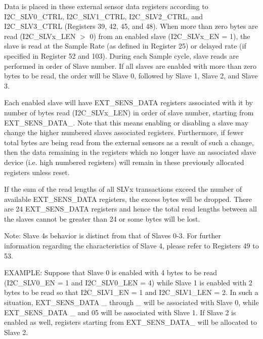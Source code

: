 Data is placed in these external sensor data registers according to I2\+C\+\_\+\+S\+L\+V0\+\_\+\+C\+T\+RL, I2\+C\+\_\+\+S\+L\+V1\+\_\+\+C\+T\+RL, I2\+C\+\_\+\+S\+L\+V2\+\_\+\+C\+T\+RL, and I2\+C\+\_\+\+S\+L\+V3\+\_\+\+C\+T\+RL (Registers 39, 42, 45, and 48). When more than zero bytes are read (I2\+C\+\_\+\+S\+L\+Vx\+\_\+\+L\+EN $>$ 0) from an enabled slave (I2\+C\+\_\+\+S\+L\+Vx\+\_\+\+EN = 1), the slave is read at the Sample Rate (as defined in Register 25) or delayed rate (if specified in Register 52 and 103). During each Sample cycle, slave reads are performed in order of Slave number. If all slaves are enabled with more than zero bytes to be read, the order will be Slave 0, followed by Slave 1, Slave 2, and Slave 3.

Each enabled slave will have E\+X\+T\+\_\+\+S\+E\+N\+S\+\_\+\+D\+A\+TA registers associated with it by number of bytes read (I2\+C\+\_\+\+S\+L\+Vx\+\_\+\+L\+EN) in order of slave number, starting from E\+X\+T\+\_\+\+S\+E\+N\+S\+\_\+\+D\+A\+T\+A\+\_. Note that this means enabling or disabling a slave may change the higher numbered slaves\textquotesingle{} associated registers. Furthermore, if fewer total bytes are being read from the external sensors as a result of such a change, then the data remaining in the registers which no longer have an associated slave device (i.\+e. high numbered registers) will remain in these previously allocated registers unless reset.

If the sum of the read lengths of all S\+L\+Vx transactions exceed the number of available E\+X\+T\+\_\+\+S\+E\+N\+S\+\_\+\+D\+A\+TA registers, the excess bytes will be dropped. There are 24 E\+X\+T\+\_\+\+S\+E\+N\+S\+\_\+\+D\+A\+TA registers and hence the total read lengths between all the slaves cannot be greater than 24 or some bytes will be lost.

Note\+: Slave 4\textquotesingle{}s behavior is distinct from that of Slaves 0-\/3. For further information regarding the characteristics of Slave 4, please refer to Registers 49 to 53.

E\+X\+A\+M\+P\+LE\+: Suppose that Slave 0 is enabled with 4 bytes to be read (I2\+C\+\_\+\+S\+L\+V0\+\_\+\+EN = 1 and I2\+C\+\_\+\+S\+L\+V0\+\_\+\+L\+EN = 4) while Slave 1 is enabled with 2 bytes to be read so that I2\+C\+\_\+\+S\+L\+V1\+\_\+\+EN = 1 and I2\+C\+\_\+\+S\+L\+V1\+\_\+\+L\+EN = 2. In such a situation, E\+X\+T\+\_\+\+S\+E\+N\+S\+\_\+\+D\+A\+TA \+\_ through \+\_ will be associated with Slave 0, while E\+X\+T\+\_\+\+S\+E\+N\+S\+\_\+\+D\+A\+TA \+\_ and 05 will be associated with Slave 1. If Slave 2 is enabled as well, registers starting from E\+X\+T\+\_\+\+S\+E\+N\+S\+\_\+\+D\+A\+T\+A\+\_ will be allocated to Slave 2.

